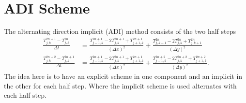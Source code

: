 \documentclass[a4aper,pagesize]{article}
\theoremstyle{definition}
\theoremstyle{plain}
\theoremstyle{remark}
\begin{document}
\section{ADI Scheme}
The alternating direction implicit (ADI) method consists of the two half steps
\begin{align}
	\frac{T_{j,k}^{2n+1} - T_{j,k}^{2n}}{\Delta t}
	&= \frac{T_{j-1,k}^{2n+1} - 2 T_{j,k}^{2n+1} + T_{j+1,k}^{2n+1}}{(\Delta x)^2}
	+ \frac{T_{j,k-1}^{2n} - 2 T_{j,k}^{2n} + T_{j,k+1}^{2n}}{(\Delta y)^2}
\\
	\frac{T_{j,k}^{2n+2} - T_{j,k}^{2n+1}}{\Delta t}
	&= \frac{T_{j-1,k}^{2n+1} - 2 T_{j,k}^{2n+1} + T_{j+1,k}^{2n+1}}{(\Delta x)^2}
	+ \frac{T_{j-1,k}^{2n+2} - 2 T_{j,k}^{2n+2} + T_{j+1,k}^{2n+2}}{(\Delta y)^2}.
\end{align}
The idea here is to have an explicit scheme in one component and an implicit in the other for each half step. Where the implicit scheme is used alternates with each half step.
\end{document}
